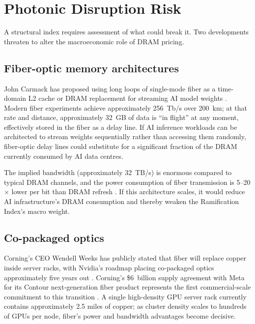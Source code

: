 \documentclass[12pt]{article}
\theoremstyle{definition}
\begin{document}
\section{Photonic Disruption Risk}
\label{sec:photonic}

A structural index requires assessment of what could break it. Two developments threaten to alter the macroeconomic role of DRAM pricing.

\subsection{Fiber-optic memory architectures}

John Carmack has proposed using long loops of single-mode fiber as a time-domain L2 cache or DRAM replacement for streaming AI model weights \cite{Carmack2025,WakilPhotonic2026}. Modern fiber experiments achieve approximately 256~Tb/s over 200~km; at that rate and distance, approximately 32~GB of data is ``in flight'' at any moment, effectively stored in the fiber as a delay line. If AI inference workloads can be architected to stream weights sequentially rather than accessing them randomly, fiber-optic delay lines could substitute for a significant fraction of the DRAM currently consumed by AI data centres.

The implied bandwidth (approximately 32~TB/s) is enormous compared to typical DRAM channels, and the power consumption of fiber transmission is 5--20$\times$ lower per bit than DRAM refresh \cite{CorningTranscript2025}. If this architecture scales, it would reduce AI infrastructure's DRAM consumption and thereby weaken the Ramification Index's macro weight.

\subsection{Co-packaged optics}

Corning's CEO Wendell Weeks has publicly stated that fiber will replace copper inside server racks, with Nvidia's roadmap placing co-packaged optics approximately five years out \cite{CorningTranscript2025}. Corning's \$6~billion supply agreement with Meta for its Contour next-generation fiber product represents the first commercial-scale commitment to this transition \cite{CorningTranscript2025}. A single high-density GPU server rack currently contains approximately 2.5 miles of copper; as cluster density scales to hundreds of GPUs per node, fiber's power and bandwidth advantages become decisive.
\end{document}
